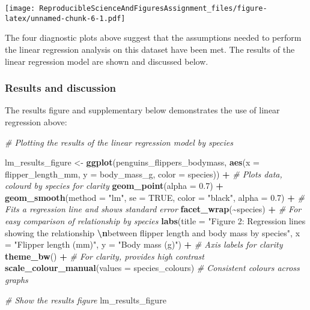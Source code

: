 \documentclass[
]{article}
\newenvironment{Shaded}{\begin{snugshade}}{\end{snugshade}}
\newcommand{\AttributeTok}[1]{\textcolor[rgb]{0.13,0.29,0.53}{#1}}
\newcommand{\CommentTok}[1]{\textcolor[rgb]{0.56,0.35,0.01}{\textit{#1}}}
\newcommand{\ConstantTok}[1]{\textcolor[rgb]{0.56,0.35,0.01}{#1}}
\newcommand{\FloatTok}[1]{\textcolor[rgb]{0.00,0.00,0.81}{#1}}
\newcommand{\FunctionTok}[1]{\textcolor[rgb]{0.13,0.29,0.53}{\textbf{#1}}}
\newcommand{\NormalTok}[1]{#1}
\newcommand{\OtherTok}[1]{\textcolor[rgb]{0.56,0.35,0.01}{#1}}
\newcommand{\SpecialCharTok}[1]{\textcolor[rgb]{0.81,0.36,0.00}{\textbf{#1}}}
\newcommand{\StringTok}[1]{\textcolor[rgb]{0.31,0.60,0.02}{#1}}
\begin{document}
\texttt{[image: ReproducibleScienceAndFiguresAssignment\_files/figure-latex/unnamed-chunk-6-1.pdf]}

The four diagnostic plots above suggest that the assumptions needed to
perform the linear regression analysis on this dataset have been met.
The results of the linear regression model are shown and discussed
below.

\subsubsection{Results and discussion}\label{results-and-discussion}

The results figure and supplementary below demonstrates the use of
linear regression above:

\begin{Shaded}
\begin{Highlighting}[]
\CommentTok{\# Plotting the results of the linear regression model by species}

\NormalTok{lm\_results\_figure }\OtherTok{\textless{}{-}} \FunctionTok{ggplot}\NormalTok{(penguins\_flippers\_bodymass, }
       \FunctionTok{aes}\NormalTok{(}\AttributeTok{x =}\NormalTok{ flipper\_length\_mm, }
           \AttributeTok{y =}\NormalTok{ body\_mass\_g,}
           \AttributeTok{color =}\NormalTok{ species)) }\SpecialCharTok{+} \CommentTok{\# Plots data, colourd by species for clarity}
  \FunctionTok{geom\_point}\NormalTok{(}\AttributeTok{alpha =} \FloatTok{0.7}\NormalTok{) }\SpecialCharTok{+} 
  \FunctionTok{geom\_smooth}\NormalTok{(}\AttributeTok{method =} \StringTok{"lm"}\NormalTok{,}
              \AttributeTok{se =} \ConstantTok{TRUE}\NormalTok{,}
              \AttributeTok{color =} \StringTok{"black"}\NormalTok{,}
              \AttributeTok{alpha =} \FloatTok{0.7}\NormalTok{) }\SpecialCharTok{+} \CommentTok{\# Fits a regression line and shows standard error}
  \FunctionTok{facet\_wrap}\NormalTok{(}\SpecialCharTok{\textasciitilde{}}\NormalTok{species) }\SpecialCharTok{+} \CommentTok{\# For easy comparison of relationship by species}
  \FunctionTok{labs}\NormalTok{(}\AttributeTok{title =} \StringTok{"Figure 2: Regression lines showing the relationship }\SpecialCharTok{\textbackslash{}n}\StringTok{between flipper length and body mass by species"}\NormalTok{,}
       \AttributeTok{x =} \StringTok{"Flipper length (mm)"}\NormalTok{, }
       \AttributeTok{y =} \StringTok{"Body mass (g)"}\NormalTok{) }\SpecialCharTok{+} \CommentTok{\# Axis labels for clarity}
  \FunctionTok{theme\_bw}\NormalTok{() }\SpecialCharTok{+} \CommentTok{\# For clarity, provides high contrast}
  \FunctionTok{scale\_colour\_manual}\NormalTok{(}\AttributeTok{values =}\NormalTok{ species\_colours) }\CommentTok{\# Consistent colours across graphs}

\CommentTok{\# Show the results figure}
\NormalTok{lm\_results\_figure}
\end{Highlighting}
\end{Shaded}
\end{document}
